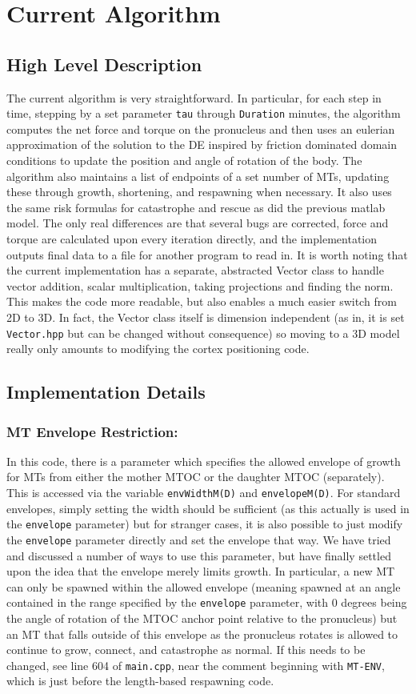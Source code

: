 \documentclass{article}
\begin{document}
\section{Current Algorithm}
\subsection{High Level Description}
The current algorithm is very straightforward. In particular, for each step in
time, stepping by a set parameter \texttt{tau} through \texttt{Duration}
minutes, the algorithm computes the net force and torque on the pronucleus and
then uses an eulerian approximation of the solution to the DE inspired by
friction dominated domain conditions to update the position and angle of
rotation of the body. The algorithm also maintains a list of endpoints of a set
number of MTs, updating these through growth, shortening, and respawning when
necessary. It also uses the same risk formulas for catastrophe and rescue as did
the previous matlab model. The only real differences are that several bugs are
corrected, force and torque are calculated upon every iteration directly, and
the implementation outputs final data to a file for another program to read in.
It is worth noting that the current implementation has a separate, abstracted
Vector class to handle vector addition, scalar multiplication, taking
projections and finding the norm. This makes the code more readable, but also
enables a much easier switch from 2D to 3D. In fact, the Vector class itself is
dimension independent (as in, it is set \texttt{Vector.hpp} but can be changed
without consequence) so moving to a 3D model really only amounts to modifying
the cortex positioning code. 
\subsection{Implementation Details}
\subsubsection{MT Envelope Restriction:}
In this code, there is a parameter which specifies the allowed envelope of
growth for MTs from either the mother MTOC or the daughter MTOC (separately).
This is accessed via the variable \texttt{envWidthM(D)} and
\texttt{envelopeM(D)}. For standard envelopes, simply setting the width should
be sufficient (as this actually is used in the \texttt{envelope} parameter) but
for stranger cases, it is also possible to just modify the \texttt{envelope}
parameter directly and set the envelope that way. We have tried and discussed a
number of ways to use this parameter, but have finally settled upon the idea
that the envelope merely limits growth. In particular, a new MT can only be
spawned within the allowed envelope (meaning spawned at an angle contained in
the range specified by the \texttt{envelope} parameter, with 0 degrees being the
angle of rotation of the MTOC anchor point relative to the pronucleus) but an MT
that falls outside of this envelope as the pronucleus rotates is allowed to
continue to grow, connect, and catastrophe as normal. If this needs to be
changed, see line 604 of \texttt{main.cpp}, near the comment beginning with
\texttt{MT-ENV}, which is just before the length-based respawning code. 
\end{document}
